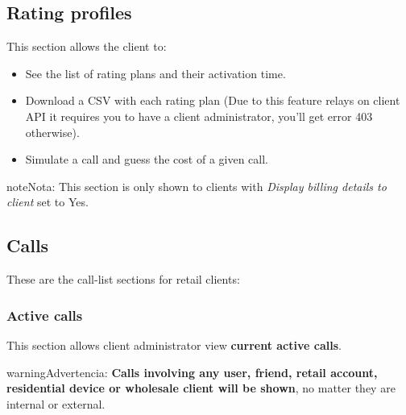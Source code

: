 \documentclass[letterpaper,10pt,spanish]{sphinxmanual}
\begin{document}
\subsection{Rating profiles}
\label{administration_portal/client/retail/rating_profiles:rating-profiles}\label{administration_portal/client/retail/rating_profiles::doc}
This section allows the client to:
\begin{itemize}
\item {} 
See the list of rating plans and their activation time.

\item {} 
Download a CSV with each rating plan (Due to this feature relays on client API it requires you to have a client administrator, you'll get error 403 otherwise).

\item {} 
Simulate a call and guess the cost of a given call.

\end{itemize}

\begin{notice}{note}{Nota:}
This section is only shown to clients with \emph{Display billing details to client} set to Yes.
\end{notice}


\subsection{Calls}
\label{administration_portal/client/retail/calls/index::doc}\label{administration_portal/client/retail/calls/index:calls}
These are the call-list sections for retail clients:


\subsubsection{Active calls}
\label{administration_portal/client/retail/calls/active_calls::doc}\label{administration_portal/client/retail/calls/active_calls:active-calls}
This section allows client administrator view \textbf{current active calls}.

\begin{notice}{warning}{Advertencia:}
\textbf{Calls involving any user, friend, retail account, residential device or wholesale client will be shown},
no matter they are internal or external.
\end{notice}
\end{document}
